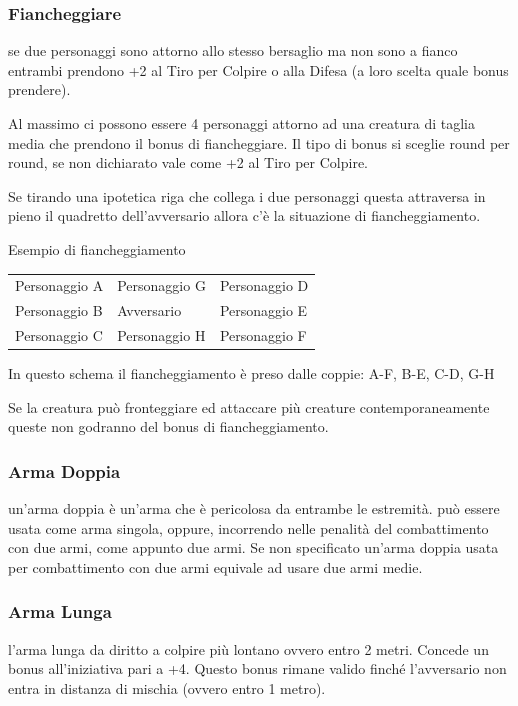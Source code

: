 \documentclass[a4paper,11pt,twoside,openany]{book}
\begin{document}
\subsubsection{Fiancheggiare} se due personaggi sono attorno allo stesso bersaglio ma non sono a fianco entrambi prendono +2 al Tiro per Colpire o alla Difesa (a loro scelta quale bonus prendere).

Al massimo ci possono essere 4 personaggi attorno ad una creatura di taglia media che prendono il bonus di fiancheggiare. Il tipo di bonus si sceglie round per round, se non dichiarato vale come +2 al Tiro per Colpire.

Se tirando una ipotetica riga che collega i due personaggi questa attraversa in pieno il quadretto dell'avversario allora c'è la situazione di fiancheggiamento.

\bigskip

Esempio di fiancheggiamento
\medskip
\begin{longtable}{L{3cm} k{3cm} k{3cm}}
\toprule
Personaggio A & Personaggio G & Personaggio D\tabularnewline
Personaggio B & Avversario & Personaggio E\tabularnewline
Personaggio C & Personaggio H & Personaggio F\tabularnewline
\end{longtable}

\bigskip

In questo schema il fiancheggiamento è preso dalle coppie: A-F, B-E, C-D, G-H

\bigskip

Se la creatura può fronteggiare ed attaccare più creature contemporaneamente queste non godranno del bonus di fiancheggiamento.

\subsubsection{Arma Doppia} un'arma doppia è un'arma che è pericolosa da entrambe le estremità. può essere usata come arma singola, oppure, incorrendo nelle penalità del combattimento con due armi, come appunto due armi. Se non specificato un'arma doppia usata per combattimento con due armi equivale ad usare due armi medie.

\subsubsection{Arma Lunga} l'arma lunga da diritto a colpire più lontano ovvero entro 2 metri. Concede un bonus all'iniziativa pari a +4. Questo bonus rimane valido finché l'avversario non entra in distanza di mischia (ovvero entro 1 metro).
\end{document}
